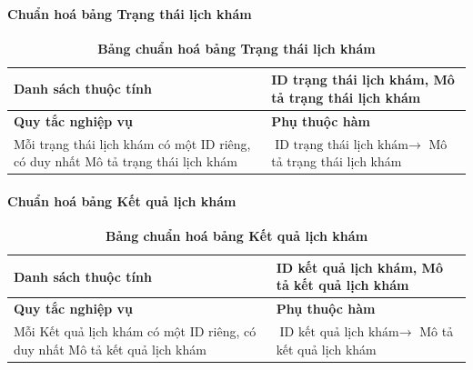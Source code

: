 \paragraph{Chuẩn hoá bảng Trạng thái lịch khám}
\mbox{}
\begin{table}[H]
	\caption{\bfseries \fontsize{12pt}{0pt}\selectfont Bảng chuẩn hoá bảng Trạng thái lịch khám}
	\centering
	\begin{tabularx}{0.9\textwidth}{|X|X|}
		\hline
		\textbf{Danh sách thuộc tính} & ID trạng thái lịch khám, Mô tả trạng thái lịch khám                                             \\
		\hline
		\textbf{Quy tắc nghiệp vụ}    & \textbf{Phụ thuộc hàm}                                                                          \\
		\hline
		Mỗi trạng thái lịch khám có một ID riêng, có duy nhất Mô tả trạng thái lịch khám
		                              & \parbox[t]{\linewidth}{$\text{ID trạng thái lịch khám} \rightarrow$ Mô tả trạng thái lịch khám} \\
		\hline
		                                         \\
		                                                   \\
		\hline
	\end{tabularx}
\end{table}

\paragraph{Chuẩn hoá bảng Kết quả lịch khám}
\mbox{}
\begin{table}[H]
	\caption{\bfseries \fontsize{12pt}{0pt}\selectfont Bảng chuẩn hoá bảng Kết quả lịch khám}
	\centering
	\begin{tabularx}{0.9\textwidth}{|X|X|}
		\hline
		\textbf{Danh sách thuộc tính} & ID kết quả lịch khám, Mô tả kết quả lịch khám                                             \\
		\hline
		\textbf{Quy tắc nghiệp vụ}    & \textbf{Phụ thuộc hàm}                                                                    \\
		\hline
		Mỗi Kết quả lịch khám có một ID riêng, có duy nhất Mô tả kết quả lịch khám
		                              & \parbox[t]{\linewidth}{$\text{ID kết quả lịch khám} \rightarrow$ Mô tả kết quả lịch khám} \\
		\hline
		                                      \\
		                                                \\
		\hline
	\end{tabularx}
\end{table}

